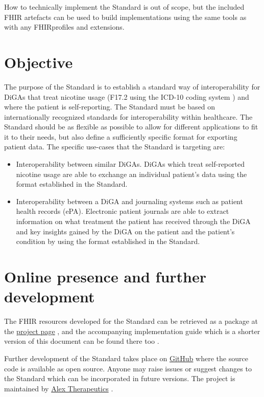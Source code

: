 \documentclass[12px]{report}
\newcommand{\fhir}{FHIR\textsuperscript{\textregistered}}
\begin{document}
How to technically implement the Standard is out of scope, but the included FHIR artefacts can be used to build implementations using the same tools as with any \fhir profiles and extensions. 


\section{Objective}
The purpose of the Standard is to establish a standard way of interoperability for DiGAs that treat nicotine usage (F17.2 using the ICD-10 coding system \cite{dimdi}) and where the patient is self-reporting. The Standard must be based on internationally recognized
standards for interoperability within healthcare. The Standard should be as flexible as possible to allow for different applications to fit it to their needs, but also define a sufficiently specific format for exporting patient data. The specific use-cases that the Standard is targeting are:

\begin{itemize}
    \item Interoperability between similar DiGAs. DiGAs which treat self-reported nicotine usage are able to exchange an individual patient's data using the format established in the Standard.
    \item Interoperability between a DiGA and journaling systems such as patient health records (ePA). Electronic patient journals are able to extract information on what treatment the patient has received through the DiGA and key insights gained by the DiGA on the patient and the patient's condition by using the format established in the Standard.
\end{itemize}

\section{Online presence and further development}
The FHIR resources developed for the Standard can be retrieved as a package at the \href{https://simplifier.net/treat-nicotine-usage-diga}{project page} \cite{project}, 
and the accompanying implementation guide which is a shorter version of this document can be found there too \cite{ig}.

Further development of the Standard takes place on \href{https://github.com/alex-therapeutics/diga-nicotine-usage-fhir}{GitHub} \cite{github} where the source code is available as open source.
Anyone may raise issues or suggest changes to the Standard which can be incorporated in future versions. The project is maintained by \href{https://www.alextherapeutics.com}{Alex Therapeutics} \cite{alex}.
\end{document}
